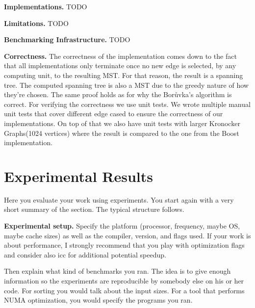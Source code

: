 \documentclass[letterpaper]{article}
\newcommand{\mypar}[1]{{\bf #1.}}
\begin{document}
\mypar{Implementations}
TODO

\mypar{Limitations}
TODO

\mypar{Benchmarking Infrastructure}
TODO

\mypar{Correctness}
The correctness of the implementation comes down to the fact that all implementations only terminate once no new edge is selected, by any computing unit, to the resulting MST. For that reason, the result is a spanning tree. The computed spanning tree is also a MST due to the greedy nature of how they're chosen. The same proof holds as for why the Bor\r{u}vka's algorithm is correct\cite{nevsetvril2012origins}. For verifying the correctness we use unit tests. We wrote multiple manual unit tests that cover different edge cased to ensure the correctness of our implementations. On top of that we also have unit tests with larger Kronocker Graphs(1024 vertices) where the result is compared to the one from the Boost implementation.




\section{Experimental Results}\label{sec:exp}

Here you evaluate your work using experiments. You start again with a
very short summary of the section. The typical structure follows.

\mypar{Experimental setup} Specify the platform (processor, frequency, maybe OS, maybe cache sizes)
as well as the compiler, version, and flags used. If your work is about performance, 
I strongly recommend that you play with optimization flags and consider also icc for additional potential speedup.

Then explain what kind of benchmarks you ran. The idea is to give enough information so the experiments are reproducible by somebody else on his or her code.
For sorting you would talk about the input sizes. For a tool that performs NUMA optimization, you would specify the programs you ran.
\end{document}
